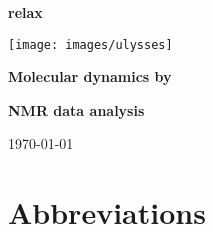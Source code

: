 \documentclass[a4paper, 11pt, twoside, openright]{book}
\begin{document}
\frontmatter



\begin{titlepage}
\begin{center}


{\Huge \textbf{relax}}

{\LARGE \textbf{}}

\centerline{\texttt{[image: images/ulysses]}}

{\huge \textbf{Molecular dynamics by}}

{\huge \textbf{NMR data analysis}}

{\large \today}

\end{center}
\end{titlepage}



\tableofcontents



\newpage
\listoffigures



\newpage
\listoftables



\chapter*{Abbreviations}
\end{document}
